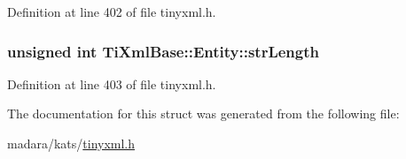 Definition at line 402 of file tinyxml.h.

\hypertarget{structTiXmlBase_1_1Entity_a22e8d820894d3360b01fed110badb876}{
\subsubsection[{strLength}]{\setlength{\rightskip}{0pt plus 5cm}unsigned int {\bf TiXmlBase::Entity::strLength}}}
\label{d8/d33/structTiXmlBase_1_1Entity_a22e8d820894d3360b01fed110badb876}


Definition at line 403 of file tinyxml.h.



The documentation for this struct was generated from the following file:\begin{DoxyCompactItemize}
\item 
madara/kats/\hyperlink{tinyxml_8h}{tinyxml.h}\end{DoxyCompactItemize}

